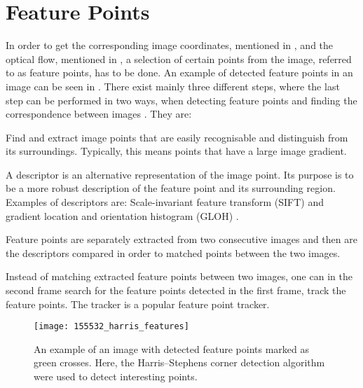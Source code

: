 \clearpage

\section{Feature Points}
In order to get the corresponding image coordinates, mentioned in , and the optical flow, mentioned in , a selection of certain points from the image, referred to as feature points, has to be done.
An example of detected feature points in an image can be seen in .
There exist mainly three different steps, where the last step can be performed in two ways, when detecting feature points and finding the correspondence between images \cite{Szeliski:2011}.
They are:

\begin{description}[align=left,labelwidth=3cm]
	\item [Feature detection] Find and extract image points that are easily recognisable and distinguish from its surroundings. Typically, this means points that have a large image gradient.
	\item [Feature description] A descriptor is an alternative representation of the image point. Its purpose is to be a more robust description of the feature point and its surrounding region. Examples of descriptors are: Scale-invariant feature transform (SIFT) and gradient location and orientation histogram (GLOH) \cite{Szeliski:2011}.
	\item [Feature matching] Feature points are separately extracted from two consecutive images and then are the descriptors compared in order to matched points between the two images.
	\item [Feature tracking] Instead of matching extracted feature points between two images, one can in the second frame search for the feature points detected in the first frame, \ie track the feature points. The \abbrKLT tracker is a popular feature point tracker.
\end{description}

\begin{figure}[!ht]
	\centering
	\texttt{[image: 155532\_harris\_features]}
	\caption{\label{fig:featurepointexample} An example of an image with detected feature points marked as green crosses. Here, the Harris–Stephens corner detection algorithm \cite{Harris:1988} were used to detect interesting points.}
\end{figure}

